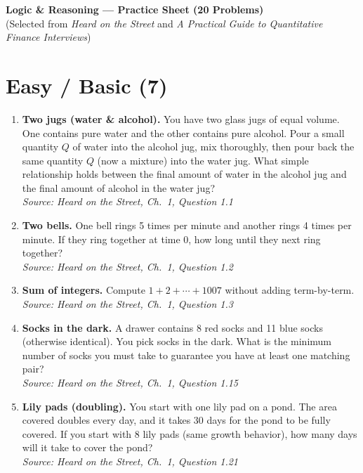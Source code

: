 \documentclass[11pt]{article}
\begin{document}
\begin{center}
{\LARGE \textbf{Logic \& Reasoning — Practice Sheet (20 Problems)}}\\[0.3em]
{\small (Selected from \textit{Heard on the Street} and \textit{A Practical Guide to Quantitative Finance Interviews})}
\end{center}

\section*{Easy / Basic (7)}

\begin{enumerate}[label=\textbf{\arabic*.}]
\item \textbf{Two jugs (water \& alcohol).} You have two glass jugs of equal volume. One contains pure water and the other contains pure alcohol. Pour a small quantity $Q$ of water into the alcohol jug, mix thoroughly, then pour back the same quantity $Q$ (now a mixture) into the water jug. What simple relationship holds between the final amount of water in the alcohol jug and the final amount of alcohol in the water jug?\\
\hfill{\small\textit{Source: Heard on the Street, Ch.\ 1, Question 1.1 }}

\item \textbf{Two bells.} One bell rings 5 times per minute and another rings 4 times per minute. If they ring together at time 0, how long until they next ring together?\\
\hfill{\small\textit{Source: Heard on the Street, Ch.\ 1, Question 1.2 }}

\item \textbf{Sum of integers.} Compute $1+2+\cdots+1007$ without adding term-by-term.\\
\hfill{\small\textit{Source: Heard on the Street, Ch.\ 1, Question 1.3 }}

\item \textbf{Socks in the dark.} A drawer contains 8 red socks and 11 blue socks (otherwise identical). You pick socks in the dark. What is the minimum number of socks you must take to guarantee you have at least one matching pair?\\
\hfill{\small\textit{Source: Heard on the Street, Ch.\ 1, Question 1.15 }}

\item \textbf{Lily pads (doubling).} You start with one lily pad on a pond. The area covered doubles every day, and it takes 30 days for the pond to be fully covered. If you start with 8 lily pads (same growth behavior), how many days will it take to cover the pond?\\
\hfill{\small\textit{Source: Heard on the Street, Ch.\ 1, Question 1.21 }}


\end{enumerate}
\end{document}
